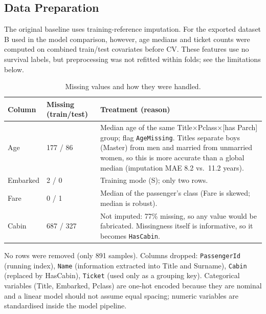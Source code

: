 \documentclass[10pt,twocolumn]{article}
\begin{document}
\subsection{Data Preparation}
The original baseline uses training-reference imputation. For the exported dataset B used in the model comparison, however, age medians and ticket counts were computed on combined train/test covariates before CV. These features use no survival labels, but preprocessing was not refitted within folds; see the limitations below.
\begin{table}[t]
\centering\small
\caption{Missing values and how they were handled.}
\label{tab:missing}
\begin{tabular}{p{1.0cm}p{1.2cm}p{4.6cm}}
\toprule
Column & Missing (train/test) & Treatment (reason) \\
\midrule
Age & 177 / 86 & Median age of the same Title$\times$Pclass$\times$[has Parch] group; flag \texttt{AgeMissing}. Titles separate boys (Master) from men and married from unmarried women, so this is more accurate than a global median (imputation MAE 8.2 vs.\ 11.2 years). \\
Embarked & 2 / 0 & Training mode (S); only two rows. \\
Fare & 0 / 1 & Median of the passenger's class (Fare is skewed; median is robust). \\
Cabin & 687 / 327 & Not imputed: 77\% missing, so any value would be fabricated. Missingness itself is informative, so it becomes \texttt{HasCabin}. \\
\bottomrule
\end{tabular}
\end{table}
No rows were removed (only 891 samples). Columns dropped: \texttt{PassengerId} (running index), \texttt{Name} (information extracted into Title and Surname), \texttt{Cabin} (replaced by HasCabin), \texttt{Ticket} (used only as a grouping key). Categorical variables (Title, Embarked, Pclass) are one-hot encoded because they are nominal and a linear model should not assume equal spacing; numeric variables are standardised inside the model pipeline.
\end{document}
